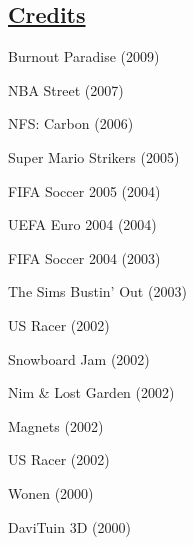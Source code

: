 \documentclass[margin, line]{resume}
\begin{document}
\begin{resume}
\section{\sc \href{http://www.mobygames.com/developer/sheet/view/developerId,94489/}{Credits}}
\begin{multicols}{3}
\begin{list2}
    \item Burnout Paradise (2009)
    \item NBA Street (2007)
    \item NFS: Carbon (2006)    
    \item Super Mario Strikers (2005)
    \item FIFA Soccer 2005 (2004)
    \item UEFA Euro 2004 (2004)
    \item FIFA Soccer 2004 (2003)
    \item The Sims Bustin' Out (2003)
    \item US Racer (2002)
    \item Snowboard Jam (2002)
    \item Nim \& Lost Garden (2002)
    \item Magnets (2002)
    \item US Racer (2002)
    \item Wonen (2000)
    \item DaviTuin 3D (2000)    
\end{list2}
\end{multicols}

\end{resume}
\end{document}
